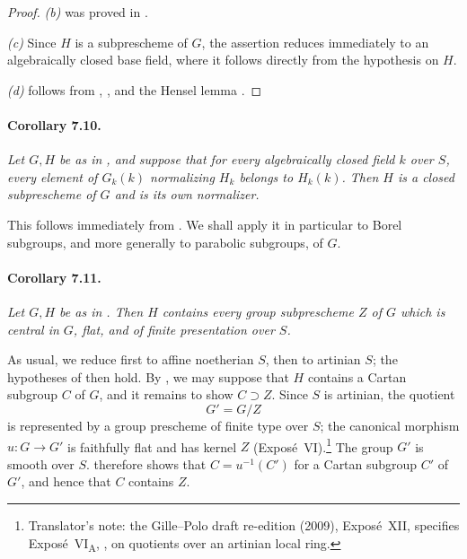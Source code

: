 \begin{proof}
\emph{(b)} was proved in .

\emph{(c)} Since \(H\) is a subprescheme of \(G\), the assertion
reduces immediately to an algebraically closed base field, where it
follows directly from the hypothesis on \(H\).

\emph{(d)} follows from \textup{}, \textup{}, and the Hensel
lemma .
\end{proof}

\paragraph{\textbf{Corollary 7.10.}}
\emph{Let \(G,H\) be as in , and suppose that for every
algebraically closed field \(k\) over \(S\), every element of
\(G_k(k)\) normalizing \(H_k\) belongs to \(H_k(k)\). Then \(H\) is
a closed subprescheme of \(G\) and is its own normalizer.}

This follows immediately from . We shall apply it in
particular to Borel subgroups, and more generally to parabolic
subgroups, of \(G\).

\paragraph{\textbf{Corollary 7.11.}}
\emph{Let \(G,H\) be as in . Then \(H\) contains every group
subprescheme \(Z\) of \(G\) which is central in \(G\), flat, and of
finite presentation over \(S\).}

As usual, we reduce first to affine noetherian \(S\), then to
artinian \(S\); the hypotheses of  then hold. By , we may
suppose that \(H\) contains a Cartan subgroup \(C\) of \(G\), and it
remains to show \(C\supset Z\). Since \(S\) is artinian, the quotient
\[
  G'=G/Z
\]
is represented by a group prescheme of finite type over \(S\); the
canonical morphism \(u:G\to G'\) is faithfully flat and has kernel
\(Z\) (Exposé~VI).\footnote{Translator's note: the Gille--Polo draft
re-edition (2009), Exposé~XII, specifies Exposé~VI\textsubscript{A},
, on quotients over an artinian local ring.} The group \(G'\) is smooth over \(S\).
 therefore shows that \(C=u^{-1}(C')\) for a Cartan
subgroup \(C'\) of \(G'\), and hence that \(C\) contains \(Z\).

